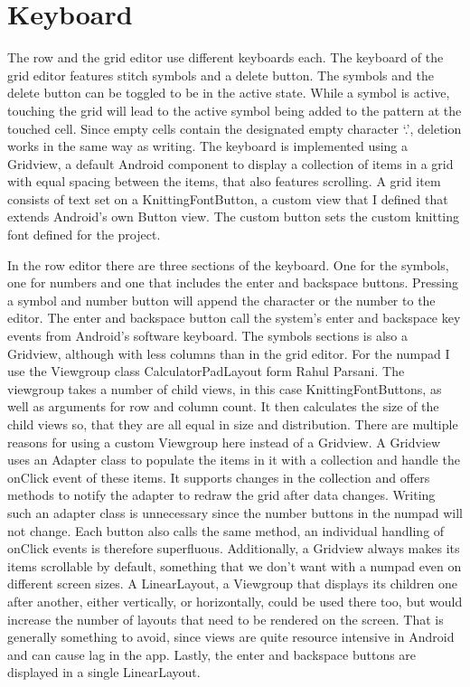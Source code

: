 \section{Keyboard}
The row and the grid editor use different keyboards each. The keyboard of the grid editor features stitch symbols and a delete button. The symbols and the delete button can be toggled to be in the active state. While a symbol is active, touching the grid will lead to the active symbol being added to the pattern at the touched cell. Since empty cells contain the designated empty character ‘.’, deletion works in the same way as writing. The keyboard is implemented using a Gridview, a default Android component to display a collection of items in a grid with equal spacing between the items, that also features scrolling. A grid item consists of text set on a KnittingFontButton, a custom view that I defined that extends Android’s own Button view. The custom button sets the custom knitting font defined for the project.

In the row editor there are three sections of the keyboard. One for the symbols, one for numbers and one that includes the enter and backspace buttons. Pressing a symbol and number button will append the character or the number to the editor. The enter and backspace button call the system’s enter and backspace key events from Android’s software keyboard.
The symbols sections is also a Gridview, although with less columns than in the grid editor. For the numpad I use the Viewgroup class CalculatorPadLayout form Rahul Parsani. The viewgroup takes a number of child views, in this case KnittingFontButtons, as well as arguments for row and column count. It then calculates the size of the child views so, that they are all equal in size and distribution. There are multiple reasons for using a custom Viewgroup here instead of a Gridview. A Gridview uses an Adapter class to populate the items in it with a collection and handle the onClick event of these items. It supports changes in the collection and offers methods to notify the adapter to redraw the grid after data changes. Writing such an adapter class is unnecessary since the number buttons in the numpad will not change. Each button also calls the same method, an individual handling of onClick events is therefore superfluous. Additionally, a Gridview always makes its items scrollable by default, something that we don’t want with a numpad even on different screen sizes. A LinearLayout, a Viewgroup that displays its children one after another, either vertically, or horizontally, could be used there too, but would increase the number of layouts that need to be rendered on the screen. That is generally something to avoid, since views are quite resource intensive in Android and can cause lag in the app. Lastly, the enter and backspace buttons are displayed in a single LinearLayout.

